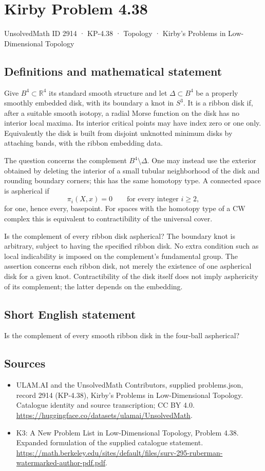 \documentclass[11pt,a4paper]{article}
\begin{document}
\section*{Kirby Problem 4.38}\label{2914}
{\small UnsolvedMath ID 2914 · KP-4.38 · Topology · Kirby's Problems in Low-Dimensional Topology}
\subsection{Definitions and mathematical statement}
Give $B^4\subset\mathbb R^4$ its standard smooth structure and let
$\Delta\subset B^4$ be a properly smoothly embedded disk, with its
boundary a knot in $S^3$. It is a ribbon disk if, after a suitable
smooth isotopy, a radial Morse function on the disk has no interior
local maxima. Its interior critical points may have index zero or
one only. Equivalently the disk is built from disjoint unknotted
minimum disks by attaching bands, with the ribbon embedding data.

The question concerns the complement $B^4\setminus\Delta$. One may
instead use the exterior obtained by deleting the interior of a small
tubular neighborhood of the disk and rounding boundary corners; this
has the same homotopy type. A connected space is aspherical if
\[
 \pi_i(X,x)=0\qquad\text{for every integer }i\ge2,
\]
for one, hence every, basepoint. For spaces with the homotopy type
of a CW complex this is equivalent to contractibility of the universal
cover.

Is the complement of every ribbon disk aspherical? The boundary knot
is arbitrary, subject to having the specified ribbon disk. No extra
condition such as local indicability is imposed on the complement's
fundamental group. The assertion concerns each ribbon disk, not merely
the existence of one aspherical disk for a given knot.
Contractibility of the disk itself does not imply asphericity of its
complement; the latter depends on the embedding.
\subsection{Short English statement}
Is the complement of every smooth ribbon disk in the four-ball aspherical?
\subsection{Sources}
\begin{itemize}
\item[S1] ULAM.AI and the UnsolvedMath Contributors, supplied problems.json, record 2914 (KP-4.38), Kirby's Problems in Low-Dimensional Topology. Catalogue identity and source transcription; CC BY 4.0.
\url{https://huggingface.co/datasets/ulamai/UnsolvedMath}.
\item[S2] K3: A New Problem List in Low-Dimensional Topology, Problem 4.38. Expanded formulation of the supplied catalogue statement.
\url{https://math.berkeley.edu/sites/default/files/surv-295-ruberman-watermarked-author-pdf.pdf}.
\end{itemize}
\end{document}
